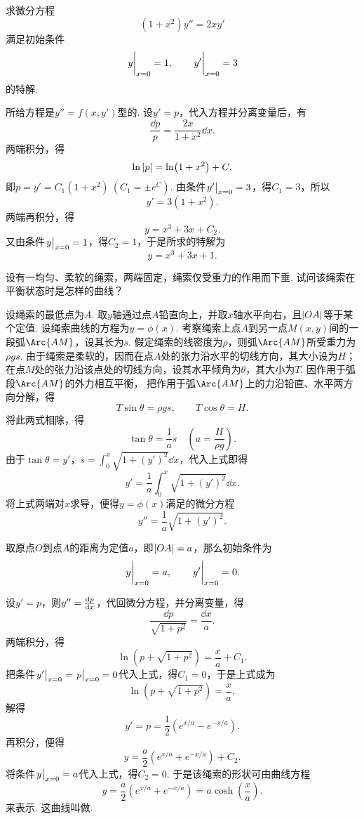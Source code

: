 \begin{example}
求微分方程\[
	(1+x^2) y'' = 2xy'
\]满足初始条件\[
	\eval{y}_{x=0} = 1,
	\qquad
	\eval{y'}_{x=0} = 3
\]的特解.
\begin{solution}
所给方程是\(y'' = f(x, y')\)型的.
设\(y' = p\)，代入方程并分离变量后，有\[
	\frac{\dd{p}}{p} = \frac{2x}{1+x^2} \dd{x}.
\]
两端积分，得\[
	\ln\abs{p} = \ln(1+x^2) + C,
\]
即\(p = y' = C_1(1+x^2)\ (C_1 = \pm e^C)\).
由条件\(\eval{y'}_{x=0}=3\)，得\(C_1 = 3\)，所以\[
	y' = 3(1+x^2).
\]
两端再积分，得\[
	y = x^3 + 3x + C_2.
\]
又由条件\(\eval{y}_{x=0}=1\)，得\(C_2=1\)，于是所求的特解为\[
	y = x^3 + 3x + 1.
\]
\end{solution}
\end{example}

\begin{example}
设有一均匀、柔软的绳索，两端固定，绳索仅受重力的作用而下垂.
试问该绳索在平衡状态时是怎样的曲线？
\begin{solution}
设绳索的最低点为\(A\).
取\(y\)轴通过点\(A\)铅直向上，并取\(x\)轴水平向右，且\(\abs{OA}\)等于某个定值.
设绳索曲线的方程为\(y = \phi(x)\).
考察绳索上点\(A\)到另一点\(M(x,y)\)间的一段弧\(\Arc{AM}\)，设其长为\(s\).
假定绳索的线密度为\(\rho\)，则弧\(\Arc{AM}\)所受重力为\(\rho gs\).
由于绳索是柔软的，因而在点\(A\)处的张力沿水平的切线方向，其大小设为\(H\)；
在点\(M\)处的张力沿该点处的切线方向，设其水平倾角为\(\theta\)，其大小为\(T\).
因作用于弧段\(\Arc{AM}\)的外力相互平衡，
把作用于弧\(\Arc{AM}\)上的力沿铅直、水平两方向分解，得\[
	T \sin\theta = \rho gs,
	\qquad
	T \cos\theta = H.
\]
将此两式相除，得\[
	\tan\theta = \frac{1}{a} s
	\quad(a = \frac{H}{\rho g}).
\]
由于\(\tan\theta = y'\)，\(s = \int_0^x \sqrt{1+(y')^2} \dd{x}\)，代入上式即得\[
	y' = \frac{1}{a} \int_0^x \sqrt{1+(y')^2} \dd{x}.
\]
将上式两端对\(x\)求导，便得\(y = \phi(x)\)满足的微分方程\[
	y'' = \frac{1}{a} \sqrt{1+(y')^2}.
\]

取原点\(O\)到点\(A\)的距离为定值\(a\)，即\(\abs{OA}=a\)，那么初始条件为\[
	\eval{y}_{x=0} = a, \qquad \eval{y'}_{x=0} = 0.
\]

设\(y' = p\)，则\(y'' = \dv{p}{x}\)，代回微分方程，并分离变量，得\[
	\frac{\dd{p}}{\sqrt{1+p^2}} = \frac{\dd{x}}{a}.
\]
两端积分，得\[
	\ln(p+\sqrt{1+p^2}) = \frac{x}{a} + C_1.
\]
把条件\(\eval{y'}_{x=0} = \eval{p}_{x=0} = 0\)代入上式，得\(C_1 = 0\)，于是上式成为\[
	\ln(p+\sqrt{1+p^2}) = \frac{x}{a},
\]
解得\[
	y' = p = \frac{1}{2} \left( e^{x/a} - e^{-x/a} \right).
\]
再积分，便得\[
	y = \frac{a}{2} \left( e^{x/a} + e^{-x/a} \right) + C_2.
\]
将条件\(\eval{y}_{x=0} = a\)代入上式，得\(C_2 = 0\).
于是该绳索的形状可由曲线方程
\begin{equation}\label{equation:微分方程.悬链线}
	y = \frac{a}{2} \left( e^{x/a} + e^{-x/a} \right)
	= a \cosh(\frac{x}{a}).
\end{equation}来表示.
这曲线叫做.
\end{solution}
\end{example}

